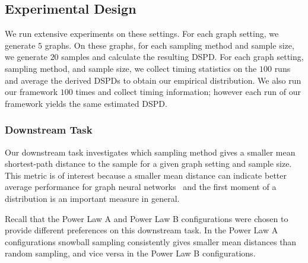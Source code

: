 \subsection{Experimental Design}

We run extensive experiments on these settings. For each graph setting, we generate $5$ graphs. On these graphs, for each sampling method and sample size, we generate $20$ samples and calculate the resulting DSPD. For each graph setting, sampling method, and sample size, we collect timing statistics on the $100$ runs and average the derived DSPDs to obtain our empirical distribution. We also run our framework $100$ times and collect timing information; however each run of our framework yields the same estimated DSPD.

\subsubsection{Downstream Task}

Our downstream task investigates which sampling method gives a smaller mean shortest-path distance to the sample for a given graph setting and sample size. This metric is of interest because a smaller mean distance can indicate better average performance for graph neural networks~\cite{ma2021subgroup} and the first moment of a distribution is an important measure in general.

Recall that the Power Law A and Power Law B configurations were chosen to provide different preferences on this downstream task. In the Power Law A configurations snowball sampling consistently gives smaller mean distances than random sampling, and vice versa in the Power Law B configurations.

